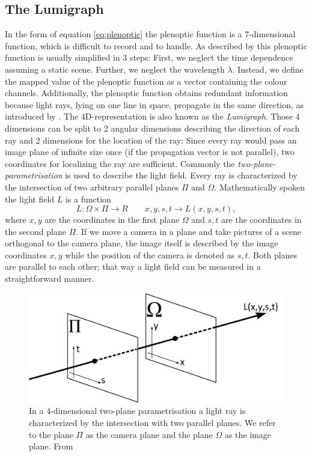 \documentclass  [
  paper    = a4,
  BCOR     = 10mm,
  twoside,
  fontsize = 12pt,
  fleqn,
  toc      = bibnumbered,
  toc      = listofnumbered,
  numbers  = noendperiod,
  headings = normal,
  listof   = leveldown,
  version  = 3.03
]                                       {scrreprt}
\begin{document}
\subsection{The Lumigraph}
In the form of equation \ref{eq:plenoptic} the plenoptic function is a 7-dimensional function, which is difficult to record and to handle. As described by \cite{wu2017light} this plenoptic function is usually simplified in 3 steps: First, we neglect the time dependence assuming a static scene. Further, we neglect the wavelength $\lambda$. Instead, we define the mapped value of the plenoptic function as a vector containing the colour channels. 
Additionally, the plenoptic function obtains redundant information because light rays, lying on one line in space, propagate in the same direction, as introduced by \cite{bolles1987epipolar}. The 4D-representation is also known as the \textit{Lumigraph}. Those 4 dimensions can be split to 2 angular dimensions describing the direction of each ray and 2 dimensions for the location of the ray: Since every ray would pass an image plane of infinite size once (if the propagation vector is not parallel), two coordinates for localizing the ray are sufficient. Commonly the \textit{two-plane-parametrisation} is used to describe the light field. Every ray is characterized by the intersection of two arbitrary parallel planes $\Pi$ and $\Omega$. Mathematically spoken the light field $L$ is a function
\begin{equation}\label{key}
L:\Omega\times \Pi \rightarrow \!R\qquad x,y,s,t\rightarrow L(x,y,s,t),
\end{equation}
where $x,y$ are the coordinates in the first plane $\Omega$ and $s,t$ are the coordinates in the second plane $\Pi$. If we move a camera in a plane and take pictures of a scene orthogonal to the camera plane, the image itself is described by the image coordinates $x,y$ while the position of the camera is denoted as $s,t$. Both planes are parallel to each other; that way a light field can be measured in a straightforward manner.
\begin{figure}[h!]
	\centering
	\includegraphics[width=0.7\linewidth]{images/twoplane_param}
	\caption[Two-plane parametrisation]{In a 4-dimensional two-plane parametrisation a light ray is characterized by the intersection with two parallel planes. We refer to the plane  $\Pi$ as the camera plane and the plane $\Omega$ as the image plane. From \cite{Xu:12}}
	\label{fig:twoplaneparam}
\end{figure}
\end{document}

